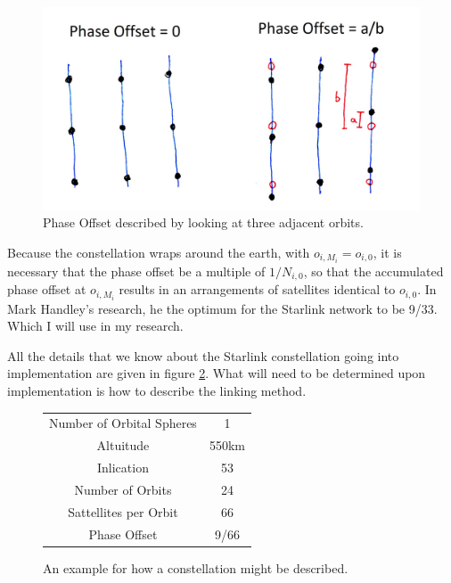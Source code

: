 \documentclass[12pt,a4paper,twoside,openright]{report}
\begin{document}
\begin{figure}
	\caption{Phase Offset described by looking at three adjacent orbits.}
	\label{Phase Offset}
	\includegraphics[width=\textwidth]{PhaseOffset}
\end{figure}

Because the constellation wraps around the earth, with $o_{i,M_i} = o_{i,0}$, it is necessary that the phase offset be a multiple of $1/N_{i,0}$, so that the accumulated phase offset at $o_{i,M_i}$ results in an arrangements of satellites identical to $o_{i,0}$. In Mark Handley's research, he the optimum for the Starlink network to be 9/33. Which I will use in my research.


All the details that we know about the Starlink constellation going into implementation are given in figure \ref{fig:Starlink Within Program}. What will need to be determined upon implementation is how to describe the linking method.

\begin{figure}
\caption{An example for how a constellation might be described.}
\label{fig:Starlink Within Program}
\begin{center}
\begin{tabular}{ | c | c  | }
	\hline
	Number of Orbital Spheres & 1 \\
	Altuitude & 550km \\
	Inlication & 53\degree\\
	Number of Orbits & 24\\
	Sattellites per Orbit & 66\\
	Phase Offset & 9/66\\
	\hline
\end{tabular}
\end{center}
\end{figure}
\end{document}
